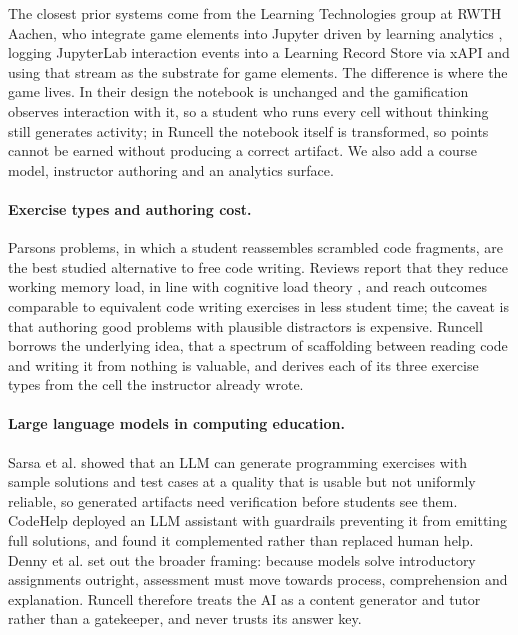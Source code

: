 \documentclass[manuscript]{acmart}
\begin{document}
The closest prior systems come from the Learning Technologies group at RWTH
Aachen, who integrate game elements into Jupyter driven by learning analytics
\cite{brocker2022integration,brocker2022gamifying}, logging JupyterLab
interaction events into a Learning Record Store via xAPI and using that stream
as the substrate for game elements. The difference is where the game lives. In
their design the notebook is unchanged and the gamification observes
interaction with it, so a student who runs every cell without thinking still
generates activity; in Runcell the notebook itself is transformed, so points
cannot be earned without producing a correct artifact. We also add a course
model, instructor authoring and an analytics surface.

\paragraph{Exercise types and authoring cost.}
Parsons problems, in which a student reassembles scrambled code fragments, are
the best studied alternative to free code writing. Reviews
\cite{du2020review,ericson2022parsons} report that they reduce working memory
load, in line with cognitive load theory \cite{sweller1988cognitive}, and reach
outcomes comparable to equivalent code writing exercises in less student time;
the caveat is that authoring good problems with plausible distractors is
expensive. Runcell borrows the underlying idea, that a spectrum of scaffolding
between reading code and writing it from nothing is valuable, and derives each
of its three exercise types from the cell the instructor already wrote.

\paragraph{Large language models in computing education.}
Sarsa et al. \cite{sarsa2022automatic} showed that an LLM can generate
programming exercises with sample solutions and test cases at a quality that is
usable but not uniformly reliable, so generated artifacts need verification
before students see them. CodeHelp \cite{liffiton2023codehelp} deployed an LLM
assistant with guardrails preventing it from emitting full solutions, and found
it complemented rather than replaced human help. Denny et al.
\cite{denny2024computing} set out the broader framing: because models solve
introductory assignments outright, assessment must move towards process,
comprehension and explanation. Runcell therefore treats the AI as a content
generator and tutor rather than a gatekeeper, and never trusts its answer key.
\end{document}
